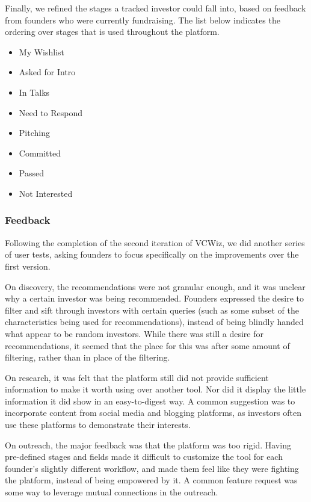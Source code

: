 Finally, we refined the stages a tracked investor could fall into, based on feedback from founders who were currently fundraising. The list below indicates the ordering over stages that is used throughout the platform.

\begin{multicols}{2}
\begin{itemize}
  \item My Wishlist
  \item Asked for Intro
  \item In Talks
  \item Need to Respond
  \item Pitching
  \item Committed
  \item Passed
  \item Not Interested
\end{itemize}
\end{multicols}

\subsubsection{Feedback}

Following the completion of the second iteration of VCWiz, we did another series of user tests, asking founders to focus specifically on the improvements over the first version.

On discovery, the recommendations were not granular enough, and it was unclear why a certain investor was being recommended. Founders expressed the desire to filter and sift through investors with certain queries (such as some subset of the characteristics being used for recommendations), instead of being blindly handed what appear to be random investors. While there was still a desire for recommendations, it seemed that the place for this was after some amount of filtering, rather than in place of the filtering.

On research, it was felt that the platform still did not provide sufficient information to make it worth using over another tool. Nor did it display the little information it did show in an easy-to-digest way. A common suggestion was to incorporate content from social media and blogging platforms, as investors often use these platforms to demonstrate their interests.

On outreach, the major feedback was that the platform was too rigid. Having pre-defined stages and fields made it difficult to customize the tool for each founder's slightly different workflow, and made them feel like they were fighting the platform, instead of being empowered by it. A common feature request was some way to leverage mutual connections in the outreach.

